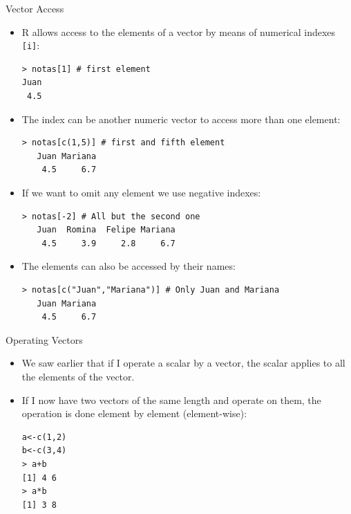 \documentclass[handout]{beamer}
\begin{document}
\begin{frame}[fragile]{Vector Access}
\scriptsize{
\begin{itemize}

 \item R allows access to the elements of a vector by means of numerical indexes \verb+[i]+: 
\begin{verbatim}
> notas[1] # first element
Juan 
 4.5
\end{verbatim}

\item The index can be another numeric vector to access more than one element:
\begin{verbatim}
> notas[c(1,5)] # first and fifth element
   Juan Mariana 
    4.5     6.7 
\end{verbatim}

\item If we want to omit any element we use negative indexes:
\begin{verbatim}
> notas[-2] # All but the second one
   Juan  Romina  Felipe Mariana 
    4.5     3.9     2.8     6.7 
\end{verbatim}

\item The elements can also be accessed by their names:
\begin{verbatim}
> notas[c("Juan","Mariana")] # Only Juan and Mariana
   Juan Mariana 
    4.5     6.7 
\end{verbatim}



\end{itemize}

 

 }
\end{frame}


\begin{frame}[fragile]{Operating Vectors}
\scriptsize{
\begin{itemize}
 \item We saw earlier that if I operate a scalar by a vector, the scalar applies to all the elements of the vector.
 \item If I now have two vectors of the same length and operate on them, the operation is done element by element (element-wise):
\begin{verbatim}
a<-c(1,2)
b<-c(3,4)
> a+b
[1] 4 6
> a*b
[1] 3 8
\end{verbatim}

\end{itemize}
 }
\end{frame}
\end{document}
